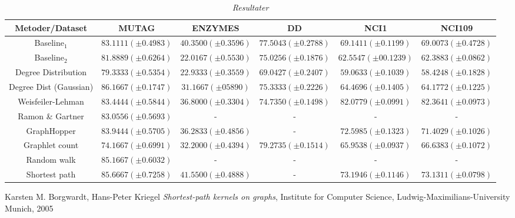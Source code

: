 \documentclass{article}
\begin{document}
\begin{table}[H]
\begin{center}
\scalebox{0.7} {
\begin{tabular}{c|c|c|c|c|c}
Metoder/Dataset & MUTAG & ENZYMES & DD & NCI1 & NCI109 \\
\hline
Baseline$_1$ & $83.1111(\pm 0.4983)$ & $40.3500(\pm 0.3596)$ & $77.5043(\pm 0.2788)$ & $69.1411(\pm 0.1199)$ & $69.0073(\pm 0.4728)$ \\
Baseline$_2$ & $81.8889 (\pm 0.6264)$ & $22.0167 (\pm 0.5530)$ & $75.0256 (\pm 0.1876)$ & $62.5547 (\pm 00.1239)$ & $62.3883 (\pm 0.0862)$ \\
Degree Distribution & $79.3333 (\pm 0.5354)$ & $22.9333 (\pm 0.3559)$ & $69.0427 (\pm 0.2407)$ & $59.0633 (\pm 0.1039)$ & $58.4248 (\pm 0.1828)$ \\
Degree Dist (Gaussian) & $86.1667 (\pm 0.1747)$ & $31.1667 (\pm 05890)$  & $75.3333 (\pm 0.2226)$ & $64.4696 (\pm 0.1405)$ & $64.1772 (\pm 0.1225)$ \\
Weisfeiler-Lehman & $83.4444 (\pm 0.5844)$ & $36.8000 (\pm 0.3304)$ & $74.7350 (\pm 0.1498)$ & $82.0779 (\pm 0.0991)$ &  $82.3641 (\pm 0.0973)$ \\
Ramon \& Gartner & $83.0556 (\pm 0.5693)$ & - & - & - & - \\
GraphHopper & $83.9444 (\pm 0.5705)$ & $36.2833 (\pm 0.4856)$ & - & $72.5985 (\pm 0.1323)$ & $71.4029 (\pm 0.1026)$ \\
Graphlet count & $74.1667 (\pm 0.6991)$ & $32.2000 (\pm 0.4394)$ & $79.2735 (\pm 0.1514)$ & $65.9538 (\pm 0.0937)$ & $66.6383 (\pm 0.1072)$ \\
Random walk & $85.1667 (\pm 0.6032)$ & - & - & - & - \\
Shortest path & $85.6667 (\pm 0.7258)$ & $41.5500 (\pm 0.4888)$ & - & $73.1946 (\pm 0.1146)$ & $73.1311 (\pm 0.0798)$ \\
\end{tabular}
}
\caption{\textit{Resultater}}
\end{center}
\end{table}


\renewcommand\refname{Referencer}
\begin{thebibliography}{9}
	Karsten M. Borgwardt, Hans-Peter Kriegel
	\emph{Shortest-path kernels on graphs},
	Institute for Computer Science, Ludwig-Maximilians-University Munich, 2005
	
\end{thebibliography}
\end{document}
